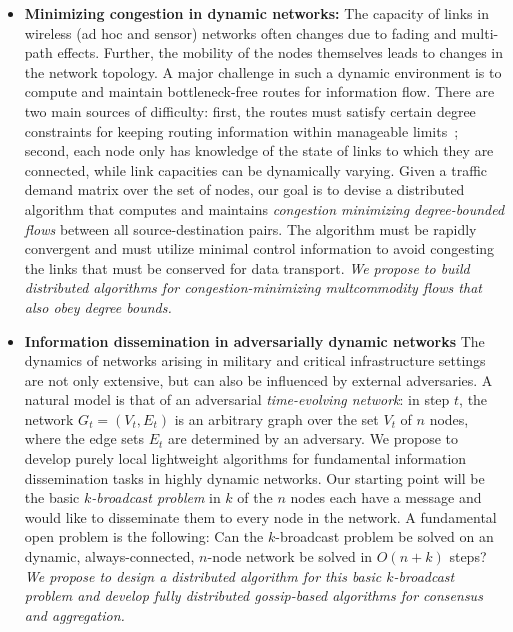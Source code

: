 \begin{itemize}
\item
{\bf Minimizing congestion in dynamic networks:} The capacity of links
in wireless (ad hoc and sensor) networks often changes due to fading
and multi-path effects.  Further, the mobility of the nodes themselves
leads to changes in the network topology.  A major challenge in such a
dynamic environment is to compute and maintain bottleneck-free routes
for information flow.  There are two main sources of difficulty:
first, the routes must satisfy certain degree constraints for
keeping routing information within manageable limits~\cite{xxx};
second, each node only has knowledge of the state of links to which
they are connected, while link capacities can be dynamically varying.
Given a traffic demand matrix over the set of nodes, our goal is to
devise a distributed algorithm that computes and maintains {\em
congestion minimizing degree-bounded flows}\/ between all
source-destination pairs.  The algorithm must be rapidly convergent
and must utilize minimal control information to avoid congesting the
links that must be conserved for data transport. {\em We propose to build distributed algorithms for congestion-minimizing multcommodity flows that also obey degree bounds.}

\item
{\bf Information dissemination in adversarially dynamic networks} The
dynamics of networks arising in military and critical infrastructure
settings are not only extensive, but can also be influenced by
external adversaries.  A natural model is that of an adversarial {\em
  time-evolving network}: in step $t$, the network $G_t = (V_t, E_t)$
is an arbitrary graph over the set $V_t$ of $n$ nodes, where the edge
sets $E_t$ are determined by an adversary.  We propose to develop
purely local lightweight algorithms for fundamental information
dissemination tasks in highly dynamic networks.  Our starting point
will be the basic {\em $k$-broadcast problem} in $k$ of the $n$ nodes
each have a message and would like to disseminate them to every node
in the network.  A fundamental open problem is the following: Can the
$k$-broadcast problem be solved on an dynamic, always-connected,
$n$-node network be solved in $O(n + k)$ steps? {\em We propose to design a distributed algorithm for this basic $k$-broadcast problem and develop fully distributed gossip-based algorithms for
consensus and aggregation.}


\end{itemize}

